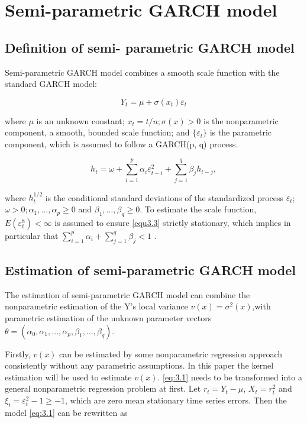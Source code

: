 \section{Semi-parametric GARCH model}

\subsection{Definition of semi- parametric GARCH model}

Semi-parametric GARCH model combines a smooth scale function with the standard GARCH model:

\begin{equation}
\label{eq:3.1}
Y_{t} = \mu + \sigma(x_{t})\varepsilon_{t}
\end{equation}

where $\mu$ is an unknown constant; $x_{t}=t/n; \sigma(x)>0$ is the nonparametric component, a smooth, bounded scale function; and $\lbrace\varepsilon_{t}\rbrace$ is the parametric component, which is assumed to follow a GARCH(p, q) process.

\begin{equation}
\label{equ3.3}
h_{t}=\omega + \sum_{i=1}^{p}\alpha_{i}\varepsilon_{t-i}^{2} + \sum_{j=1}^{q}\beta_{j}h_{t-j},
\end{equation}

where $h_t^{1/2}$ is the conditional standard deviations of the standardized process $\varepsilon_t$; $ \omega>0;  \alpha_{1}, \ldots ,\alpha_{p}\geq0$ and $\beta_{1},\ldots,\beta_{q}\geq0$.    To estimate the scale function, $E(\varepsilon_{t}^{8})<\infty$ is assumed to ensure \ref{equ3.3} strictly stationary, which implies in particular that $\sum_{i=1}^p\alpha_i+\sum_{j=1}^q\beta_j<1$ \citep{Feng2004}.

\subsection{Estimation of semi-parametric GARCH model}

The estimation of semi-parametric GARCH model can combine the nonparametric estimation of the Y's local variance  $v(x)=\sigma^{2}(x)$,with parametric estimation of the unknown parameter vectors $\theta = (\alpha_{0},\alpha_{1},\ldots,\alpha_{p},\beta_{1},\ldots,\beta_{q})$.

Firstly, $v(x)$ can be estimated by some nonparametric regression approach consistently without any parametric assumptions. In this paper the kernel estimation will be used to estimate $v(x)$. \ref{eq:3.1} needs to be transformed into a general nonparametric regression problem at first. Let $ r_{t}=Y_{t}-\mu$, $X_{t}=r_{t}^{2}$ and $\xi_{t}=\varepsilon_{t}^{2}-1 \geq -1$, which are zero mean stationary time series errors. Then the model \ref{eq:3.1} can be rewritten as 

